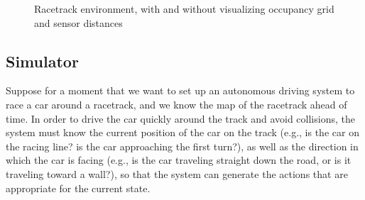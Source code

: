 \documentclass[a4paper]{article}
\theoremstyle{definition}
\theoremstyle{plain}
\begin{document}
\begin{figure}[t!]%
    \centering
    \qquad
    \caption{Racetrack environment, with and without visualizing occupancy grid and sensor distances}%
    \label{fig:example}%
\end{figure}

\subsection*{Simulator}

Suppose for a moment that we want to set up an autonomous driving system to race a car around a racetrack, and we know the map of the racetrack ahead of time. In order to drive the car quickly around the track and avoid collisions, the system must know the current position of the car on the track (e.g., is the car on the racing line? is the car approaching the first turn?), as well as the direction in which the car is facing (e.g., is the car traveling straight down the road, or is it traveling toward a wall?), so that the system can generate the actions that are appropriate for the current state.
\end{document}
